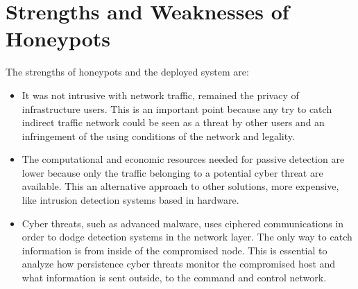\documentclass[a4paper]{llncs}
\begin{document}
\section{Strengths and Weaknesses of Honeypots}
\label{sec:Strengths&Weaknesses}
The strengths of honeypots and the deployed system are:
\begin{itemize}
	\item It was not intrusive with network traffic, remained the privacy of infrastructure users. This is an important point because any try to catch indirect traffic network could be seen as a threat by other users and an infringement of the using conditions of the network and legality.
	\item The computational and economic resources needed for passive detection are lower because only the traffic belonging to a potential cyber threat are available. This an alternative approach to other solutions, more expensive, like intrusion detection systems based in hardware.
	\item Cyber threats, such as advanced malware, uses ciphered communications in order to dodge detection systems in the network layer. The only way to catch information is from inside of the compromised node. This is essential to analyze how persistence cyber threats monitor the compromised host and what information is sent outside, to the command and control network.
\end{itemize}
\end{document}
